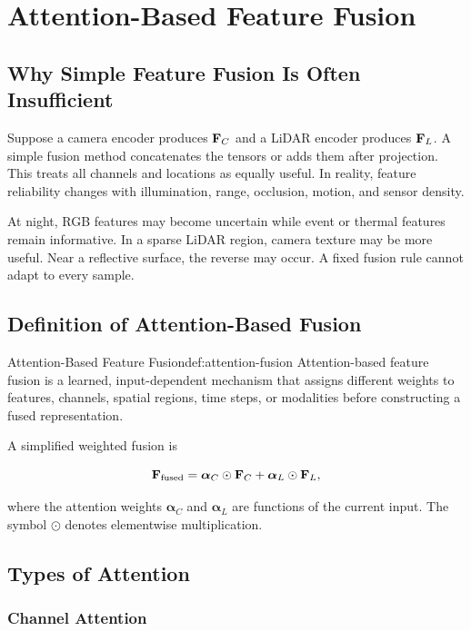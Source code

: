 \chapter{Attention-Based Feature Fusion}
\label{chap:attention}

\section{Why Simple Feature Fusion Is Often Insufficient}

Suppose a camera encoder produces \(\mathbf{F}_{C}\) and a LiDAR encoder produces \(\mathbf{F}_{L}\). A simple fusion method concatenates the tensors or adds them after projection. This treats all channels and locations as equally useful. In reality, feature reliability changes with illumination, range, occlusion, motion, and sensor density.

At night, RGB features may become uncertain while event or thermal features remain informative. In a sparse LiDAR region, camera texture may be more useful. Near a reflective surface, the reverse may occur. A fixed fusion rule cannot adapt to every sample.

\section{Definition of Attention-Based Fusion}

\begin{definition}{Attention-Based Feature Fusion}{def:attention-fusion}
Attention-based feature fusion is a learned, input-dependent mechanism that assigns different weights to features, channels, spatial regions, time steps, or modalities before constructing a fused representation.
\end{definition}

A simplified weighted fusion is

\[
    \mathbf{F}_{\text{fused}}
    = \boldsymbol{\alpha}_{C}\odot\mathbf{F}_{C}
    + \boldsymbol{\alpha}_{L}\odot\mathbf{F}_{L},
\]

where the attention weights \(\boldsymbol{\alpha}_{C}\) and \(\boldsymbol{\alpha}_{L}\) are functions of the current input. The symbol \(\odot\) denotes elementwise multiplication.

\section{Types of Attention}

\subsection{Channel Attention}

